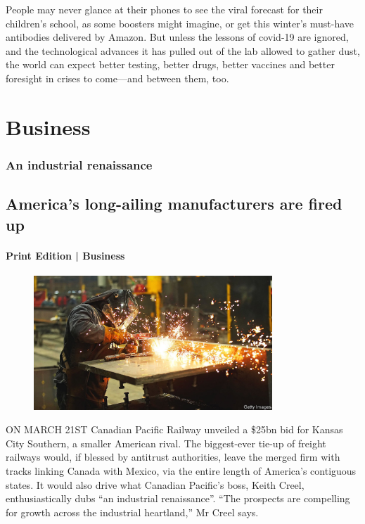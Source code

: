 \documentclass{article}
\begin{document}
People may never glance at their phones to see the viral forecast for their children's school, as some boosters might imagine, or get this winter's must-have antibodies delivered by Amazon. But unless the lessons of covid-19 are ignored, and the technological advances it has pulled out of the lab allowed to gather dust, the world can expect better testing, better drugs, better vaccines and better foresight in crises to come---and between them, too. {} 
\clearpage
\section{Business }
\subsubsection{An industrial renaissance }
\subsection{America's long-ailing manufacturers are fired up }
\paragraph{Print Edition | Business  \quad \color{gray}{Mar 27th 2021 }}
\begin{figure}[h]
\centering
\includegraphics[width=0.8\textwidth]{images/20210327_WBP002_0.jpg}
\end{figure}
\lettrine{O}N MARCH 21ST Canadian Pacific Railway unveiled a \$25bn bid for Kansas City Southern, a smaller American rival. The biggest-ever tie-up of freight railways would, if blessed by antitrust authorities, leave the merged firm with tracks linking Canada with Mexico, via the entire length of America's contiguous states. It would also drive what Canadian Pacific's boss, Keith Creel, enthusiastically dubs ``an industrial renaissance''. ``The prospects are compelling for growth across the industrial heartland,'' Mr Creel says. 
\end{document}
